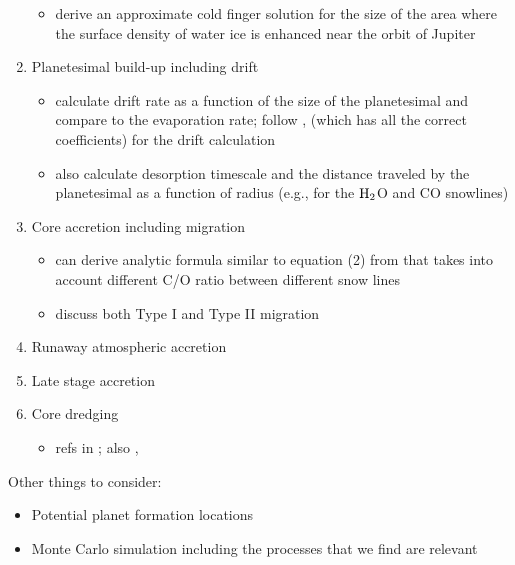 \documentclass[12pt, preprint]{aastex}
\begin{document}
\begin{enumerate}
\begin{itemize}
\item \citet{stevenson88} derive an approximate cold finger solution for the size of the area where the surface density of water ice is enhanced near the orbit of Jupiter
\end{itemize}
\item{Planetesimal build-up including drift}
\begin{itemize}
\item calculate drift rate as a function of the size of the planetesimal and compare to the evaporation rate; follow \citet{weidenschilling77}, \citet{chiang10} (which has all the correct coefficients) for the drift calculation
\item also calculate desorption timescale and the distance traveled by the planetesimal as a function of radius (e.g., for the $\rm H_2$O and CO snowlines)
\end{itemize}
\item Core accretion including migration
\begin{itemize}
\item can derive analytic formula similar to equation (2) from \citet{oberg11} that takes into account different C/O ratio between different snow lines
\item discuss both Type I and Type II migration
\end{itemize}
\item Runaway atmospheric accretion
\item{Late stage accretion}
\item{Core dredging}
\begin{itemize}
\item refs in \citet{lodders09}; also \citet{stevenson85}, \citet{guillot04}
\end{itemize}
\end{enumerate}

Other things to consider:

\begin{itemize}
\item Potential planet formation locations
\item Monte Carlo simulation including the processes that we find are relevant
\end{itemize}
\end{document}
